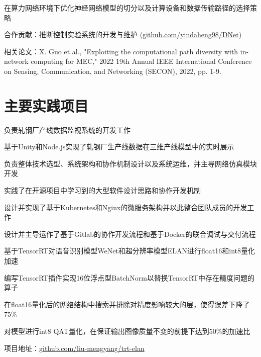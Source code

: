 \documentclass[]{deedy-resume-openfont}
\begin{document}
\begin{minipage}[t]{0.77\textwidth}
	\begin{tightemize}
		\item 在算力网络环境下优化神经网络模型的切分以及计算设备和数据传输路径的选择策略
		\item 合作贡献：推断控制实验系统的开发与维护 (\href{https://github.com/yindaheng98/DNet}{github.com/yindaheng98/DNet})
		\item 相关论文：X. Guo et al., "Exploiting the computational path diversity with in-network computing for MEC," 2022 19th Annual IEEE International Conference on Sensing, Communication, and Networking (SECON), 2022, pp. 1-9.
	\end{tightemize}
    \sectionsep


    \section{主要实践项目}
	\begin{tightemize}
		\item 负责轧钢厂产线数据监视系统的开发工作
		\item 基于Unity和Node.js实现了轧钢厂生产线数据在三维产线模型中的实时展示
	\end{tightemize}
	\sectionsep

	\begin{tightemize}
		\item 负责整体技术选型、系统架构和协作机制设计以及系统运维，并主导网络仿真模块开发
		\item 实践了在开源项目中学习到的大型软件设计思路和协作开发机制
		\item 设计并实现了基于Kubernetes和Nginx的微服务架构并以此整合团队成员的开发工作
		\item 设计并主导运作了基于Gitlab的协作开发流程和基于Docker的联合调试与交付流程
	\end{tightemize}
	\sectionsep

	\begin{tightemize}
		\item 基于TensorRT对语音识别模型WeNet和超分辨率模型ELAN进行float16和int8量化加速
		\item 编写TensorRT插件实现16位浮点型BatchNorm以替换TensorRT中存在精度问题的算子
		\item 在float16量化后的网络结构中搜索并排除对精度影响较大的层，使得误差下降了75\%
		\item 对模型进行int8 QAT量化，在保证输出图像质量不变的前提下达到50\%的加速比
		\item 项目地址：\href{https://github.com/liu-mengyang/trt-elan}{github.com/liu-mengyang/trt-elan}
	\end{tightemize}
	\sectionsep


\end{minipage}
\end{document}
